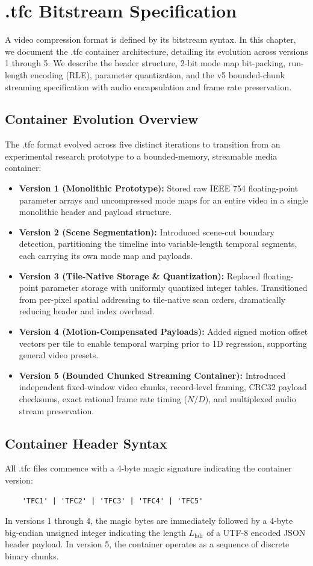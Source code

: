 \chapter{.tfc Bitstream Specification}
\label{chap:bitstream}

A video compression format is defined by its bitstream syntax. In this chapter, we document the .tfc container architecture, detailing its evolution across versions 1 through 5. We describe the header structure, 2-bit mode map bit-packing, run-length encoding (RLE), parameter quantization, and the v5 bounded-chunk streaming specification with audio encapsulation and frame rate preservation.

\section{Container Evolution Overview}
The .tfc format evolved across five distinct iterations to transition from an experimental research prototype to a bounded-memory, streamable media container:
\begin{itemize}
    \item \textbf{Version 1 (Monolithic Prototype):} Stored raw IEEE 754 floating-point parameter arrays and uncompressed mode maps for an entire video in a single monolithic header and payload structure.
    \item \textbf{Version 2 (Scene Segmentation):} Introduced scene-cut boundary detection, partitioning the timeline into variable-length temporal segments, each carrying its own mode map and payloads.
    \item \textbf{Version 3 (Tile-Native Storage \& Quantization):} Replaced floating-point parameter storage with uniformly quantized integer tables. Transitioned from per-pixel spatial addressing to tile-native scan orders, dramatically reducing header and index overhead.
    \item \textbf{Version 4 (Motion-Compensated Payloads):} Added signed motion offset vectors per tile to enable temporal warping prior to 1D regression, supporting general video presets.
    \item \textbf{Version 5 (Bounded Chunked Streaming Container):} Introduced independent fixed-window video chunks, record-level framing, CRC32 payload checksums, exact rational frame rate timing ($N/D$), and multiplexed audio stream preservation.
\end{itemize}

\section{Container Header Syntax}
All .tfc files commence with a 4-byte magic signature indicating the container version:
\begin{verbatim}
    'TFC1' | 'TFC2' | 'TFC3' | 'TFC4' | 'TFC5'
\end{verbatim}
In versions 1 through 4, the magic bytes are immediately followed by a 4-byte big-endian unsigned integer indicating the length $L_{\text{hdr}}$ of a UTF-8 encoded JSON header payload. In version 5, the container operates as a sequence of discrete binary chunks.

